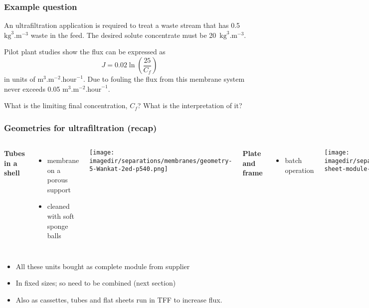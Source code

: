 \begin{frame}\frametitle{Example question}
	An ultrafiltration application is required to treat a waste stream that has 0.5~$\text{kg}^3\text{.m}^{-3}$ waste in the feed. The desired solute concentrate must be 20~$\text{kg}^3\text{.m}^{-3}$.
	
	\vspace{12pt}
	Pilot plant studies show the flux can be expressed as 
	\[
		J = 0.02 \ln \left(\frac{25}{C_f} \right)
	\]
	in units of $\text{m}^3.\text{m}^{-2}.\text{hour}^{-1}$. Due to fouling the flux from this membrane system never exceeds 0.05 $\text{m}^3.\text{m}^{-2}.\text{hour}^{-1}$.
	
	\vspace{12pt}
	What is the limiting final concentration, $C_f$? What is the interpretation of it?
\end{frame}

\begin{frame}\frametitle{Geometries for ultrafiltration (recap)}
	\begin{columns}[t]
			\textbf{Tubes in a shell}
				\begin{itemize}
					\item	membrane on a porous support
					\item	cleaned with soft sponge balls
				\end{itemize}
			\begin{center}
				\texttt{[image: \\imagedir/separations/membranes/geometry-5-Wankat-2ed-p540.png]}
			\end{center}
			\textbf{Plate and frame}
				\begin{itemize}
					\item	batch operation
				\end{itemize}
				\begin{center}
					\texttt{[image: \\imagedir/separations/membranes/flat-sheet-module-CRv2-5ed-p456.png]}
				\end{center}
	\end{columns}
	\begin{itemize}
		\item	All these units bought as complete module from supplier
		\item	In fixed sizes; so need to be combined (next section)
		\item	Also as cassettes, tubes and flat sheets run in TFF to increase flux. %
	\end{itemize}
	
\end{frame}

